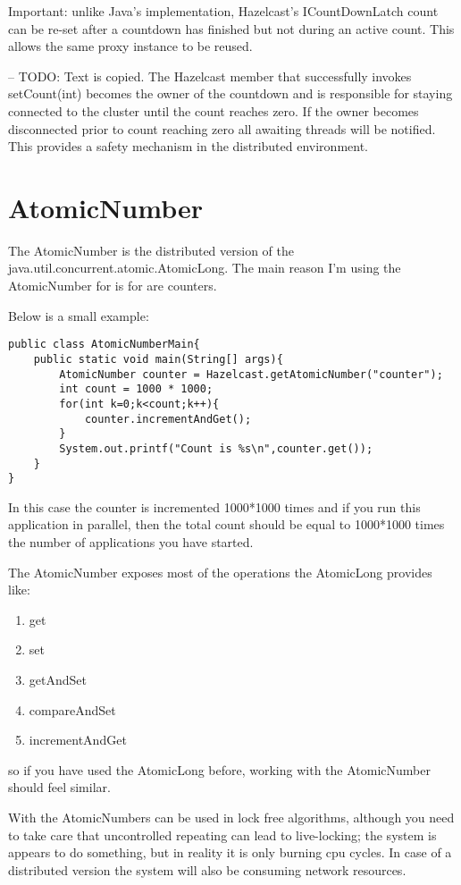 Important: unlike Java's implementation, Hazelcast's ICountDownLatch count can be re-set
after a countdown has finished but not during an active count. This allows the same
proxy instance to be reused.

-- TODO: Text is copied.
The Hazelcast member that successfully invokes setCount(int) becomes the owner of the countdown 
and is responsible for staying connected to the cluster until the count reaches zero. If the owner 
becomes disconnected prior to count reaching zero all awaiting threads will be notified. This provides 
a safety mechanism in the distributed environment.

\section{AtomicNumber}

The AtomicNumber is the distributed version of the java.util.concurrent.atomic.AtomicLong.
The main reason I'm using the AtomicNumber for is for are counters. 

Below is a small example:
\begin{verbatim}
public class AtomicNumberMain{
    public static void main(String[] args){
        AtomicNumber counter = Hazelcast.getAtomicNumber("counter");
        int count = 1000 * 1000;
        for(int k=0;k<count;k++){
            counter.incrementAndGet();
        }
        System.out.printf("Count is %s\n",counter.get());
    }
}
\end{verbatim}
In this case the counter is incremented 1000*1000 times and if you run this application
in parallel, then the total count should be equal to 1000*1000 times the number of applications
you have started.

The AtomicNumber exposes most of the operations the AtomicLong provides like:
\begin{enumerate}
\item get
\item set
\item getAndSet
\item compareAndSet
\item incrementAndGet
\end{enumerate}
so if you have used the AtomicLong before, working with the AtomicNumber should feel similar.

With the AtomicNumbers can be used in lock free algorithms, although you need to 
take care that uncontrolled repeating can lead to live-locking; the system is appears to do
something, but in reality it is only burning cpu cycles. In case of a distributed version 
the system will also be consuming network resources. 

